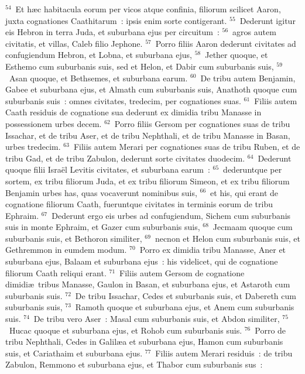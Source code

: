 ${}^{54}$~Et h\ae c habitacula eorum per vicos atque confinia, filiorum scilicet Aaron, juxta cognationes Caathitarum~: ipsis enim sorte contigerant.
${}^{55}$~Dederunt igitur eis Hebron in terra Juda, et suburbana ejus per circuitum~:
${}^{56}$~agros autem civitatis, et villas, Caleb filio Jephone.
${}^{57}$~Porro filiis Aaron dederunt civitates ad confugiendum Hebron, et Lobna, et suburbana ejus,
${}^{58}$~Jether quoque, et Esthemo cum suburbanis suis, sed et Helon, et Dabir cum suburbanis suis,
${}^{59}$~Asan quoque, et Bethsemes, et suburbana earum.
${}^{60}$~De tribu autem Benjamin, Gabee et suburbana ejus, et Almath cum suburbanis suis, Anathoth quoque cum suburbanis suis~: omnes civitates, tredecim, per cognationes suas.
${}^{61}$~Filiis autem Caath residuis de cognatione sua dederunt ex dimidia tribu Manasse in possessionem urbes decem.
${}^{62}$~Porro filiis Gersom per cognationes suas de tribu Issachar, et de tribu Aser, et de tribu Nephthali, et de tribu Manasse in Basan, urbes tredecim.
${}^{63}$~Filiis autem Merari per cognationes suas de tribu Ruben, et de tribu Gad, et de tribu Zabulon, dederunt sorte civitates duodecim.
${}^{64}$~Dederunt quoque filii Isra\"el Levitis civitates, et suburbana earum~:
${}^{65}$~dederuntque per sortem, ex tribu filiorum Juda, et ex tribu filiorum Simeon, et ex tribu filiorum Benjamin urbes has, quas vocaverunt nominibus suis,
${}^{66}$~et his, qui erant de cognatione filiorum Caath, fueruntque civitates in terminis eorum de tribu Ephraim.
${}^{67}$~Dederunt ergo eis urbes ad confugiendum, Sichem cum suburbanis suis in monte Ephraim, et Gazer cum suburbanis suis,
${}^{68}$~Jecmaam quoque cum suburbanis suis, et Bethoron similiter,
${}^{69}$~necnon et Helon cum suburbanis suis, et Gethremmon in eumdem modum.
${}^{70}$~Porro ex dimidia tribu Manasse, Aner et suburbana ejus, Balaam et suburbana ejus~: his videlicet, qui de cognatione filiorum Caath reliqui erant.
${}^{71}$~Filiis autem Gersom de cognatione dimidi\ae\ tribus Manasse, Gaulon in Basan, et suburbana ejus, et Astaroth cum suburbanis suis.
${}^{72}$~De tribu Issachar, Cedes et suburbanis suis, et Dabereth cum suburbanis suis,
${}^{73}$~Ramoth quoque et suburbana ejus, et Anem cum suburbanis suis.
${}^{74}$~De tribu vero Aser~: Masal cum suburbanis suis, et Abdon similiter,
${}^{75}$~Hucac quoque et suburbana ejus, et Rohob cum suburbanis suis.
${}^{76}$~Porro de tribu Nephthali, Cedes in Galil\ae a et suburbana ejus, Hamon cum suburbanis suis, et Cariathaim et suburbana ejus.
${}^{77}$~Filiis autem Merari residuis~: de tribu Zabulon, Remmono et suburbana ejus, et Thabor cum suburbanis sus~:
